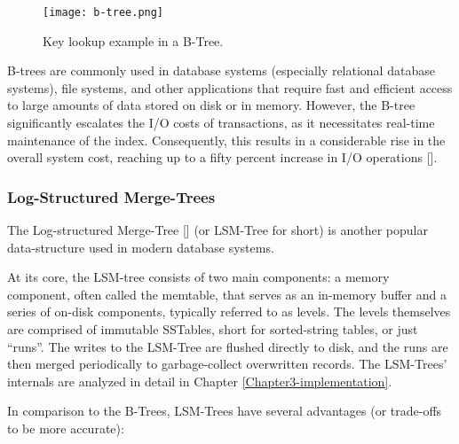 \begin{figure}[h]
    \centering
    \texttt{[image: b-tree.png]}
    \caption{Key lookup example in a B-Tree.}
    \label{fig:b-tree}
\end{figure}

B-trees are commonly used in database systems (especially relational database systems), file systems, and other applications that require fast and efficient access to large amounts of data stored on disk or in memory. However, the B-tree significantly escalates the I/O costs of transactions, as it necessitates real-time maintenance of the index. Consequently, this results in a considerable rise in the overall system cost, reaching up to a fifty percent increase in I/O operations [\cite{lsmtree}].

\subsubsection{Log-Structured Merge-Trees}

The Log-structured Merge-Tree [\cite{lsmtree}] (or LSM-Tree for short) is another popular data-structure used in modern database systems.

At its core, the LSM-tree consists of two main components: a memory component, often called the memtable, that serves as an in-memory buffer and a series of on-disk components, typically referred to as levels. The levels themselves are comprised of immutable SSTables, short for sorted-string tables, or just ``runs''. The writes to the LSM-Tree are flushed directly to disk, and the runs are then merged periodically to garbage-collect overwritten records. The LSM-Trees' internals are analyzed in detail in Chapter \ref{Chapter3-implementation}.

In comparison to the B-Trees, LSM-Trees have several advantages (or trade-offs to be more accurate):

